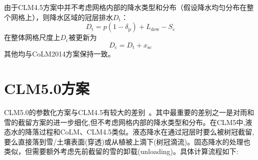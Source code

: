 由于CLM4.5方案中并不考虑网格内部的降水类型和分布（假设降水均匀分布在整个网格上），则降水区域的冠层排水$D_{\mathrm {t}}$：
\begin{equation}
  D_{\mathrm {t}}=p\left(1-\delta_{\mathrm{p}}\right)+L_{\mathrm{dew}}-S_{\mathrm{c}}
\end{equation}
在整体网格尺度上$D_{\mathrm {c}} $被更新为
\begin{equation}
  D_{\mathrm {c}} =D_{\mathrm {t}}+x_{\mathrm{s c}}
\end{equation}
其他均与CoLM2014方案保持一致。

\section{CLM5.0方案}
CLM5.0的参数化方案与CLM4.5有较大的差别~\citep{lawrence2019community}。其中最重要的差别之一是对雨和雪的截留方案的进一步细化,但不考虑网格内部的降水类型和分布。在CLM5中,液态水的降落过程和CoLM、CLM4.5类似。液态降水在通过冠层时要么被树冠截留,要么直接落到雪/土壤表面(穿透)或从植被上滴下(树冠滴流)。固态降水的处理也类似，但需要额外考虑先前截留的雪的卸载(unloading)。具体计算流程如下:

